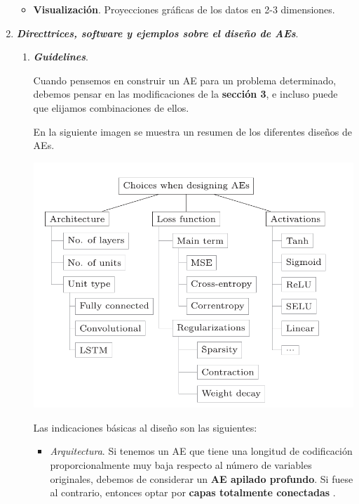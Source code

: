 \begin{enumerate}
\begin{itemize}
        \item \textbf{Visualización}. Proyecciones gráficas de los datos en 2-3 dimensiones.
        
    \end{itemize}
    
    \item\textbf{\textit{Directtrices, software y ejemplos sobre el diseño de AEs}}.
    \par
    \begin{enumerate}
    \vspace{5mm}
        \item \textbf{\textit{Guidelines}}. 
        \par
        Cuando pensemos en construir un AE para un problema determinado, debemos pensar en las modificaciones de la \textbf{sección 3}, e incluso puede que elijamos combinaciones de ellos.
        
        En la siguiente imagen se muestra un resumen de los diferentes diseños de AEs.
        
        \vspace{5mm}
        \begin{center}
            \includegraphics[width = .8\textwidth]{imagenes/AE_disenios_p6.png}
        \end{center}
        \vspace{5mm}
        
        Las indicaciones básicas al diseño son las siguientes:
        
        \begin{itemize}
            \item \textit{Arquitectura}. Si tenemos un AE que tiene una longitud de codificación proporcionalmente muy baja respecto al número de variables originales, debemos de considerar un \textbf{AE apilado profundo}. Si fuese al contrario, entonces optar por \textbf{capas totalmente conectadas} .
            

\end{itemize}
\end{enumerate}
\end{enumerate}

